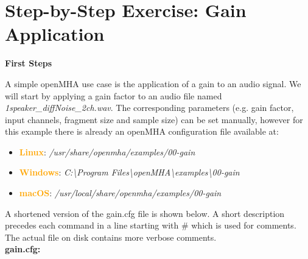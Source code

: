 \documentclass[11pt,a4paper,twoside]{article}
\newcommand{\+}{\discretionary{\mbox{\scriptsize$\hookleftarrow$}}{}{}}
\begin{document}
{{

\section{Step-by-Step Exercise: Gain Application}

\textbf{First Steps}
\label{sec:first_steps}

A simple openMHA use case is the application of a gain to an audio signal.
We will start by applying a gain factor to an audio file named {{\ttfamily \textit{1speaker\_diffNoise\_2ch.wav}}}. The corresponding parameters (e.g. gain factor, input channels, fragment size and sample size) can be set manually, however for this example there is already an openMHA configuration file available at: 
\begin{itemize}\label{list:examples-location}
\item \textcolor{orange}{\textbf{Linux}}: \textit{/usr/share/openmha/examples/00-gain} 
\item \textcolor{orange}{\textbf{Windows}}: \textit{C:\textbackslash Program Files\textbackslash openMHA\textbackslash examples\textbackslash 00-gain}
\item \textcolor{orange}{\textbf{macOS}}: \textit{/usr/local/share/openmha/examples/00-gain} 
\end{itemize}

A shortened version of the gain.cfg file is shown below.
A short description precedes each command
in a line starting with \# which is used for comments.
The actual file on disk contains more verbose comments.
\\

\textbf{gain.cfg:}

}}
\end{document}
